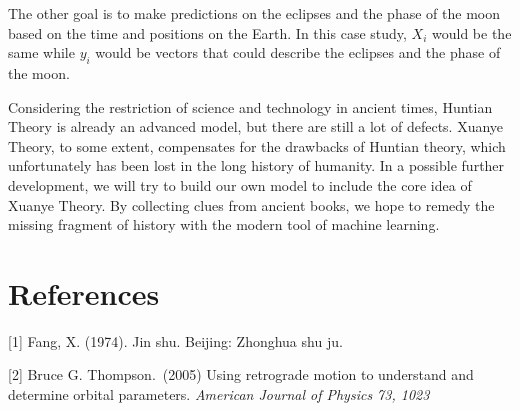 \documentclass{article}
\begin{document}
The other goal is to make predictions on the eclipses and the phase of the moon based on the time and positions on the Earth. In this case study, $X_i$ would be the same while $y_i$ would be vectors that could describe the eclipses and the phase of the moon. %

Considering the restriction of science and technology in ancient times, Huntian Theory is already an advanced model, but there are still a lot of defects. Xuanye Theory, to some extent, compensates for the drawbacks of Huntian theory, which unfortunately has been lost in the long history of humanity. In a possible further development, we will try to build our own model to include the core idea of Xuanye Theory. By collecting clues from ancient books, we hope to remedy the missing fragment of history with the modern tool of machine learning. 

\section*{References}

\medskip

\small

[1] Fang, X. (1974). Jin shu. Beijing: Zhonghua shu ju.

[2] Bruce G. Thompson.\ (2005) Using retrograde motion to understand and determine orbital parameters. {\it American Journal of Physics 73, 1023}
\end{document}

